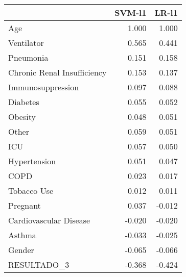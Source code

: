 \begin{tabular}{lrr}
\toprule
{} &  SVM-l1 &  LR-l1 \\
\midrule
Age                         &   1.000 &  1.000 \\
Ventilator                  &   0.565 &  0.441 \\
Pneumonia                   &   0.151 &  0.158 \\
Chronic Renal Insufficiency &   0.153 &  0.137 \\
Immunosuppression           &   0.097 &  0.088 \\
Diabetes                    &   0.055 &  0.052 \\
Obesity                     &   0.048 &  0.051 \\
Other                       &   0.059 &  0.051 \\
ICU                         &   0.057 &  0.050 \\
Hypertension                &   0.051 &  0.047 \\
COPD                        &   0.023 &  0.017 \\
Tobacco Use                 &   0.012 &  0.011 \\
Pregnant                    &   0.037 & -0.012 \\
Cardiovascular Disease      &  -0.020 & -0.020 \\
Asthma                      &  -0.033 & -0.025 \\
Gender                      &  -0.065 & -0.066 \\
RESULTADO\_3                 &  -0.368 & -0.424 \\
\bottomrule
\end{tabular}

